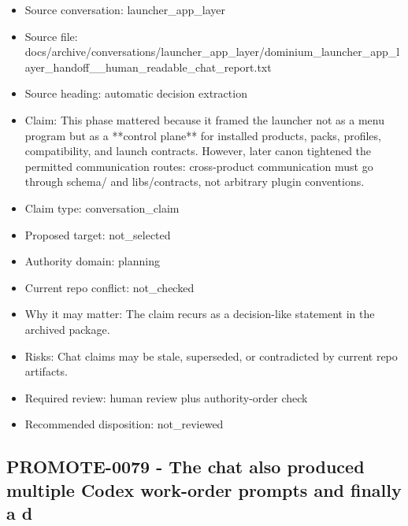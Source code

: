 \documentclass[11pt,a4paper]{report}
\begin{document}
\begin{itemize}
\item Source conversation: launcher\_app\_layer
\item Source file: docs/archive/conversations/launcher\_app\_layer/dominium\_launcher\_app\_layer\_handoff\_\_human\_readable\_chat\_report.txt
\item Source heading: automatic decision extraction
\item Claim: This phase mattered because it framed the launcher not as a menu program but as a **control plane** for installed products, packs, profiles, compatibility, and launch contracts. However, later canon tightened the permitted communication routes: cross-product communication must go through schema/ and libs/contracts, not arbitrary plugin conventions.
\item Claim type: conversation\_claim
\item Proposed target: not\_selected
\item Authority domain: planning
\item Current repo conflict: not\_checked
\item Why it may matter: The claim recurs as a decision-like statement in the archived package.
\item Risks: Chat claims may be stale, superseded, or contradicted by current repo artifacts.
\item Required review: human review plus authority-order check
\item Recommended disposition: not\_reviewed
\end{itemize}

\subsection{PROMOTE-0079 - The chat also produced multiple Codex work-order prompts and finally a d}
\end{document}
